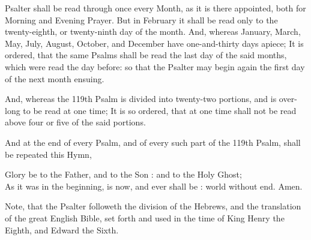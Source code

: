 
 Psalter shall be read through once every Month, as it is there appointed, both for Morning and Evening Prayer. But in February it shall be read only to the twenty-eighth, or twenty-ninth day of the month.
And, whereas January, March, May, July, August, October, and December have one-and-thirty days apiece; It is ordered, that the same Psalms shall be read the last day of the said months, which were read the day before: so that the Psalter may begin again the first day of the next month ensuing.

And, whereas the 119th Psalm is divided into twenty-two portions, and is over-long to be read at one time; It is so ordered, that at one time shall not be read above four or five of the said portions.

And at the end of every Psalm, and of every such part of the 119th Psalm, shall be repeated this Hymn,

\begin{quoting}Glory be to the Father, and to the Son : and to the Holy Ghost;\\
As it was in the beginning, is now, and ever shall be : world without end. Amen.
\end{quoting}

Note, that the Psalter followeth the division of the Hebrews, and the translation of the great English Bible, set forth and used in the time of King Henry the Eighth, and Edward the Sixth.

\clearpage
